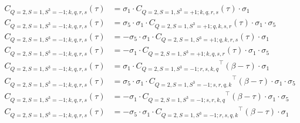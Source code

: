 \begin{equation}
  \begin{aligned}
    C_{Q=2,S=1,S^3=-1;k,q,r,s} (\tau) &= \sigma_1\cdot{C_{Q=2,S=1,S^3=+1;k,q,r,s}} (\tau) \cdot\sigma_1
    \\
    C_{Q=2,S=1,S^3=-1;k,q,r,s} (\tau) &= \sigma_5\cdot \sigma_1\cdot{C_{Q=2,S=1,S^3=+1;q,k,s,r}} (\tau) \cdot\sigma_1\cdot\sigma_5
    \\
    C_{Q=2,S=1,S^3=-1;k,q,r,s} (\tau) &= - \sigma_5\cdot \sigma_1\cdot{C_{Q=2,S=1,S^3=+1;q,k,r,s}} (\tau) \cdot\sigma_1
    \\
    C_{Q=2,S=1,S^3=-1;k,q,r,s} (\tau) &= - \sigma_1\cdot{C_{Q=2,S=1,S^3=+1;k,q,s,r}} (\tau) \cdot\sigma_1\cdot\sigma_5
    \\
    C_{Q=2,S=1,S^3=-1;k,q,r,s} (\tau) &= \sigma_1\cdot{C_{Q=2,S=1,S^3=-1;r,s,k,q}}^\top (\beta-\tau) \cdot\sigma_1 
    \\
    C_{Q=2,S=1,S^3=-1;k,q,r,s} (\tau) &= \sigma_5\cdot \sigma_1\cdot{C_{Q=2,S=1,S^3=-1;s,r,q,k}}^\top (\beta-\tau) \cdot\sigma_1\cdot\sigma_5
    \\
    C_{Q=2,S=1,S^3=-1;k,q,r,s} (\tau) &= - \sigma_1\cdot{C_{Q=2,S=1,S^3=-1;s,r,k,q}}^\top (\beta-\tau) \cdot\sigma_1\cdot\sigma_5 
    \\
    C_{Q=2,S=1,S^3=-1;k,q,r,s} (\tau) &= - \sigma_5\cdot \sigma_1\cdot{C_{Q=2,S=1,S^3=-1;r,s,q,k}}^\top (\beta-\tau) \cdot\sigma_1
    \\
  \end{aligned}
\end{equation}


